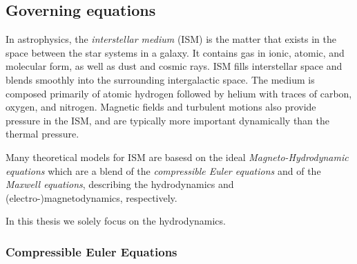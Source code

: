 \subsection{Governing equations}
\label{sec:governing-equations}

In astrophysics, the \emph{interstellar medium} (ISM) is the matter that exists
in the space between the star systems in a galaxy. It contains gas in ionic,
atomic, and molecular form, as well as dust and cosmic rays. ISM fills
interstellar space and blends smoothly into the surrounding intergalactic
space. The medium is composed primarily of atomic hydrogen followed by helium
with traces of carbon, oxygen, and nitrogen. Magnetic fields and turbulent
motions also provide pressure in the ISM, and are typically more important
dynamically than the thermal pressure.

Many theoretical models for ISM are basesd on the ideal
\emph{Magneto-Hydrodynamic equations} which are a blend of the \emph{compressible
Euler equations} and of the \emph{Maxwell equations}, describing the hydrodynamics
and (electro-)magnetodynamics, respectively.

In this thesis we solely focus on the hydrodynamics.

\subsubsection{Compressible Euler Equations}

